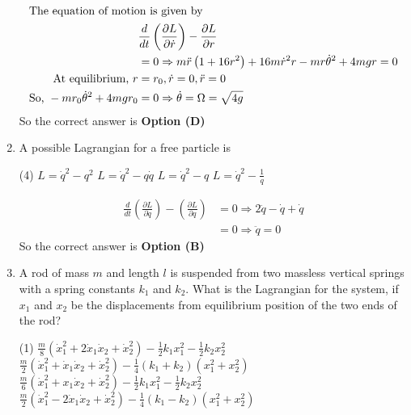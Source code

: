 \begin{enumerate}
\begin{answer}
\begin{align*}
	\intertext{The equation of motion is given by}
	&\frac{d}{d t}\left(\frac{\partial L}{\partial \dot{r}}\right)-\frac{\partial L}{\partial r}\\&=0 \Rightarrow m \ddot{r}\left(1+16 r^{2}\right)+16 m \dot{r}^{2} r-m r \dot{\theta}^{2}+4 m g r=0\\
	\text{	At equilibrium, }r&=r_{0}, \dot{r}=0, \ddot{r}=0\\
	\text{So, }-m r_{0} \dot{\theta}^{2}+4 m g r_{0}&=0 \Rightarrow \dot{\theta}=\Omega=\sqrt{4 g}
	\end{align*}
	So the correct answer is \textbf{Option (D)}
\end{answer}
	\item A possible Lagrangian for a free particle is
	{}
	\begin{tasks}(4)
		\task[\textbf{A.}] $L=\dot{q}^{2}-q^{2}$
		\task[\textbf{B.}] $L=\dot{q}^{2}-q \dot{q}$
		\task[\textbf{C.}] $L=\dot{q}^{2}-q$
		\task[\textbf{D.}] $L=\dot{q}^{2}-\frac{1}{q}$
	\end{tasks}
\begin{answer}
	\begin{align*}
	\frac{d}{d t}\left(\frac{\partial L}{\partial \dot{q}}\right)-\left(\frac{\partial L}{\partial q}\right)&=0 \Rightarrow 2 \ddot{q}-\dot{q}+\dot{q}\\&=0 \Rightarrow \ddot{q}=0
	\end{align*}
	So the correct answer is \textbf{Option (B)}
\end{answer}
	\item  A rod of mass $m$ and length $l$ is suspended from two massless vertical springs with a spring constants $k_{1}$ and $k_{2} .$ What is the Lagrangian for the system, if $x_{1}$ and $x_{2}$ be the displacements from equilibrium position of the two ends of the rod?
	{}
	\begin{tasks}(1)
		\task[\textbf{A.}] $\frac{m}{8}\left(\dot{x}_{1}^{2}+2 \dot{x}_{1} \dot{x}_{2}+\dot{x}_{2}^{2}\right)-\frac{1}{2} k_{1} x_{1}^{2}-\frac{1}{2} k_{2} x_{2}^{2}$
		\task[\textbf{B.}] $\frac{m}{2}\left(\dot{x}_{1}^{2}+\dot{x}_{1} \dot{x}_{2}+\dot{x}_{2}^{2}\right)-\frac{1}{4}\left(k_{1}+k_{2}\right)\left(x_{1}^{2}+x_{2}^{2}\right)$
		\task[\textbf{C.}] $\frac{m}{6}\left(\dot{x}_{1}^{2}+x_{1} \dot{x}_{2}+\dot{x}_{2}^{2}\right)-\frac{1}{2} k_{1} x_{1}^{2}-\frac{1}{2} k_{2} x_{2}^{2}$
		\task[\textbf{D.}] $\frac{m}{2}\left(\dot{x}_{1}^{2}-2 \dot{x}_{1} \dot{x}_{2}+\dot{x}_{2}^{2}\right)-\frac{1}{4}\left(k_{1}-k_{2}\right)\left(x_{1}^{2}+x_{2}^{2}\right)$

\end{tasks}
\end{enumerate}
